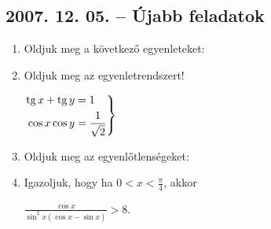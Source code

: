 \subsection*{2007. 12. 05. -- Újabb feladatok}
\begin{enumerate}
\item Oldjuk meg a következő egyenleteket:
\item Oldjuk meg az egyenletrendszert!

$\left.
\begin{aligned}
\mathop{\mathrm{tg}}\nolimits x+\mathop{\mathrm{tg}}\nolimits y&=1\\
\cos x\cos y&=\frac{1}{\sqrt{2}}
\end{aligned}
\right\}$
\item Oldjuk meg az egyenlőtlenségeket:
\item Igazoljuk, hogy ha $0<x<\frac{\pi}{4}$, akkor

$\displaystyle{\frac{\cos x}{\sin^2x(\cos x-\sin x)}>8}$.
\end{enumerate}

